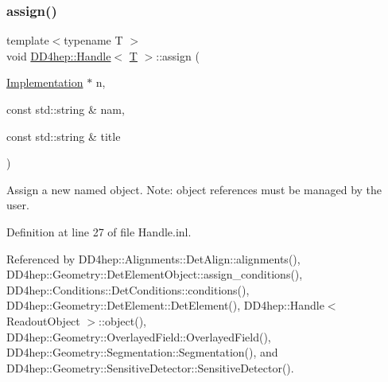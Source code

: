 \hypertarget{class_d_d4hep_1_1_handle_a9f5b5d3feb89adf95fdfc4148c711209}{}\label{class_d_d4hep_1_1_handle_a9f5b5d3feb89adf95fdfc4148c711209} 
\subsubsection{\texorpdfstring{assign()}{assign()}\hspace{0.1cm}{\footnotesize\ttfamily [1/2]}}
{\footnotesize\ttfamily template$<$typename T $>$ \\
void \hyperlink{class_d_d4hep_1_1_handle}{D\+D4hep\+::\+Handle}$<$ \hyperlink{class_t}{T} $>$\+::assign (\begin{DoxyParamCaption}\item[{\hyperlink{class_d_d4hep_1_1_handle_ad7ff728a25806079516b8965b9113f1a}{Implementation} $\ast$}]{n,  }\item[{const std\+::string \&}]{nam,  }\item[{const std\+::string \&}]{title }\end{DoxyParamCaption})}



Assign a new named object. Note\+: object references must be managed by the user. 



Definition at line 27 of file Handle.\+inl.



Referenced by D\+D4hep\+::\+Alignments\+::\+Det\+Align\+::alignments(), D\+D4hep\+::\+Geometry\+::\+Det\+Element\+Object\+::assign\+\_\+conditions(), D\+D4hep\+::\+Conditions\+::\+Det\+Conditions\+::conditions(), D\+D4hep\+::\+Geometry\+::\+Det\+Element\+::\+Det\+Element(), D\+D4hep\+::\+Handle$<$ Readout\+Object $>$\+::object(), D\+D4hep\+::\+Geometry\+::\+Overlayed\+Field\+::\+Overlayed\+Field(), D\+D4hep\+::\+Geometry\+::\+Segmentation\+::\+Segmentation(), and D\+D4hep\+::\+Geometry\+::\+Sensitive\+Detector\+::\+Sensitive\+Detector().

\hypertarget{class_d_d4hep_1_1_handle_a21f25f49cd2d12c4448006f5343b6999}{}\label{class_d_d4hep_1_1_handle_a21f25f49cd2d12c4448006f5343b6999} 
